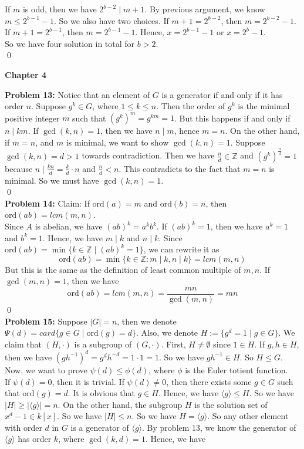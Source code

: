 \documentclass[12pt]{amsart}
\newcommand{\Z}{\mathbb{Z}}
\newcommand{\ord}{\mathrm{ord}}
\begin{document}
If $m$ is odd, then we have $2^{b-2}\mid m+1$. By previous argument, we know $m\leq 2^{b-1}-1$. So we also have two choices. If $m+1=2^{b-2}$, then $m=2^{b-2}-1$. If $m+1=2^{b-1}$, then $m=2^{b-1}-1$. Hence, $x=2^{b-1}-1$ or $x=2^{b}-1$.\\
So we have four solution in total for $b>2$.
\\\qed\\
\begin{center}
    \textbf{Chapter 4}
\end{center}
\textbf{Problem 13:} Notice that an element of $G$ is a generator if and only if it has order $n$. Suppose $g^k\in G$, where $1\leq k\leq n$. Then the order of $g^k$ is the minimal positive integer $m$ such that $(g^k)^m=g^{km}=1$. But this happens if and only if $n\mid km$. If $\gcd(k,n)=1$, then we have $n\mid m$, hence $m=n$. On the other hand, if $m=n$, and $m$ is minimal, we want to show $\gcd(k,n)=1$. Suppose $\gcd(k,n)=d>1$ towards contradiction. Then we have $\frac{n}{d}\in\Z$ and $(g^k)^\frac{n}{d}=1$ because $n\mid \frac{kn}{d}=\frac{k}{d}\cdot n$ and $\frac{n}{d}<n$. This contradicts to the fact that $m=n$ is minimal. So we must have $\gcd(k,n)=1$.
\\\qed\\
\textbf{Problem 14:} Claim: If $\ord(a)=m$ and $\ord(b)=n$, then $\ord(ab)=lcm(m,n)$.\\
Since $A$ is abelian, we have $(ab)^k=a^kb^k$. If $(ab)^k=1$, then we have $a^k=1$ and $b^k=1$. Hence, we have $m\mid k$ and $n\mid k$. Since $\ord(ab)=\min\{k\in\Z\mid (ab)^k=1\}$, we can rewrite it as 
\[\ord(ab)=\min\{k\in\Z: m\mid k,n\mid k\}=lcm(m,n)\] 
But this is the same as the definition of least common multiple of $m,n$. If $\gcd(m,n)=1$, then we have 
\[\ord(ab)=lcm(m,n)=\frac{mn}{\gcd(m,n)}=mn\]
\qed\\
\textbf{Problem 15:} Suppose $|G|=n$, then we denote $\Psi(d)=card\{g\in G\mid \ord(g)=d \}$. Also, we denote $H:=\{g^d=1\mid g\in G\}$. We claim that $(H,\cdot)$ is a subgroup of $(G,\cdot)$. First, $H\neq \emptyset$ since $1\in H$. If $g,h\in H$, then we have $(gh^{-1})^d=g^dh^{-d}=1\cdot 1=1$. So we have $gh^{-1}\in H$. So $H\leq G$. Now, we want to prove $\psi(d)\leq \phi(d)$, where $\phi$ is the Euler totient function.\\
If $\psi(d)=0$, then it is trivial. If $\psi(d)\neq 0$, then there exists some $g\in G$ such that $\ord(g)=d$. It is obvious that $g\in H$. Hence, we have $\langle g\rangle \leq H$. So we have $\mid H\mid \geq \mid \langle g\rangle \mid =n$. On the other hand, the subgroup $H$ is the solution set of $x^d-1\in k[x]$. So we have $\mid H\mid \leq n$. So we have $H=\langle g\rangle$. So any other element with order $d$ in $G$ is a generator of $\langle g\rangle$. By problem 13, we know the generator of $\langle g\rangle$ has order $k$, where $\gcd(k,d)=1$. Hence, we have 
\end{document}
